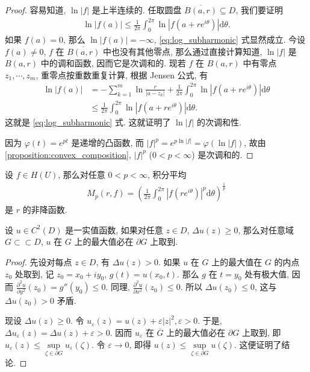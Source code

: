 \documentclass[../../main.tex]{subfiles}%
\begin{document}
\begin{proof}
容易知道, \(\ln |f|\) 是上半连续的. 任取圆盘 \(\overline{B(a,r)} \subseteq D\), 我们要证明
\begin{align}
\ln |f(a)| \leqslant \frac{1}{2\pi} \int_{0}^{2\pi} \ln |f(a+re^{i\theta})| \mathrm{d}\theta.
\label{eq:log_subharmonic}
\end{align}
如果 \(f(a) = 0\), 那么 \(\ln |f(a)| = -\infty\), \eqref{eq:log_subharmonic} 式显然成立. 今设 \(f(a) \neq 0\), \(f\) 在 \(\overline{B(a,r)}\) 中也没有其他零点, 那么通过直接计算知道, \(\ln |f|\) 是 \(B(a,r)\) 中的调和函数, 因而它是次调和的. 现若 \(f\) 在 \(B(a,r)\) 中有零点 \(z_1, \cdots, z_m\), 重零点按重数重复计算, 根据 Jensen 公式, 有
\begin{align*}
\ln |f(a)| &= - \sum\limits_{k=1}^{m} \ln \frac{r}{|a - z_k|} + \frac{1}{2\pi} \int_{0}^{2\pi} \ln |f(a+re^{i\theta})| \mathrm{d}\theta \\
&\leqslant \frac{1}{2\pi} \int_{0}^{2\pi} \ln |f(a+re^{i\theta})| \mathrm{d}\theta.
\end{align*}
这就是 \eqref{eq:log_subharmonic} 式. 这就证明了 \(\ln |f|\) 的次调和性.

因为 \(\varphi(t) = e^{pt}\) 是递增的凸函数, 而 \(|f|^p = e^{p \ln |f|} = \varphi(\ln |f|)\), 故由 \cref{proposition:convex_composition}, \(|f|^p\) (\(0 < p < \infty\)) 是次调和的.
\end{proof}

\begin{proposition}
设 \(f \in H(U)\), 那么对任意 \(0 < p < \infty\), 积分平均
\begin{align*}
M_p(r,f) = \left( \frac{1}{2\pi} \int_{0}^{2\pi} |f(re^{i\theta})|^p \mathrm{d}\theta \right)^{\frac{1}{p}}
\end{align*}
是 \(r\) 的非降函数.
\end{proposition}

\begin{proposition}
\label{proposition:Delta_positive_max}
设 \(u \in C^2(D)\) 是一实值函数, 如果对任意 \(z \in D\), \(\Delta u(z) \geqslant 0\), 那么对任意域 \(G \subset\subset D\), \(u\) 在 \(G\) 上的最大值必在 \(\partial G\) 上取到.
\end{proposition}
\begin{proof}

先设对每点 \(z \in D\), 有 \(\Delta u(z) > 0\). 如果 \(u\) 在 \(G\) 上的最大值在 \(G\) 的内点 \(z_0\) 处取到, 记 \(z_0 = x_0 + i y_0\), \(g(t) = u(x_0,t)\). 那么 \(g\) 在 \(t=y_0\) 处有极大值, 因而 \(\frac{\partial^2 u}{\partial y^2}(z_0) = g''(y_0) \leqslant 0\). 同理, \(\frac{\partial^2 u}{\partial x^2}(z_0) \leqslant 0\). 所以 \(\Delta u(z_0) \leqslant 0\), 这与 \(\Delta u(z_0) > 0\) 矛盾.

现设 \(\Delta u(z) \geqslant 0\). 令 \(u_{\varepsilon}(z) = u(z) + \varepsilon |z|^2, \varepsilon > 0\). 于是, \(\Delta u_{\varepsilon}(z) = \Delta u(z) + \varepsilon > 0\). 因而 \(u_\varepsilon\) 在 \(\overline{G}\) 上的最大值必在 \(\partial G\) 上取到, 即 \(u_\varepsilon(z) \leqslant \sup\limits_{\zeta \in \partial G} u_\varepsilon(\zeta)\). 令 \(\varepsilon \to 0\), 即得 \(u(z) \leqslant \sup\limits_{\zeta \in \partial G} u(\zeta)\). 这便证明了结论.
\end{proof}
\end{document}
